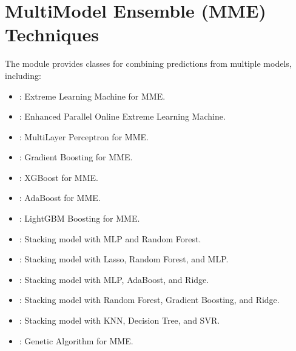 \documentclass[letterpaper,10pt,english]{sphinxmanual}
\begin{document}
\sphinxstepscope


\section{Multi\sphinxhyphen{}Model Ensemble (MME) Techniques}
\label{\detokenize{mme:multi-model-ensemble-mme-techniques}}\label{\detokenize{mme::doc}}
\sphinxAtStartPar
The  module provides classes for combining predictions from multiple models, including:
\begin{itemize}
\item {} 
\sphinxAtStartPar
{}: Extreme Learning Machine for MME.

\item {} 
\sphinxAtStartPar
{}: Enhanced Parallel Online Extreme Learning Machine.

\item {} 
\sphinxAtStartPar
{}: Multi\sphinxhyphen{}Layer Perceptron for MME.

\item {} 
\sphinxAtStartPar
{}: Gradient Boosting for MME.

\item {} 
\sphinxAtStartPar
{}: XGBoost for MME.

\item {} 
\sphinxAtStartPar
{}: AdaBoost for MME.

\item {} 
\sphinxAtStartPar
{}: LightGBM Boosting for MME.

\item {} 
\sphinxAtStartPar
{}: Stacking model with MLP and Random Forest.

\item {} 
\sphinxAtStartPar
{}: Stacking model with Lasso, Random Forest, and MLP.

\item {} 
\sphinxAtStartPar
{}: Stacking model with MLP, AdaBoost, and Ridge.

\item {} 
\sphinxAtStartPar
{}: Stacking model with Random Forest, Gradient Boosting, and Ridge.

\item {} 
\sphinxAtStartPar
{}: Stacking model with KNN, Decision Tree, and SVR.

\item {} 
\sphinxAtStartPar
{}: Genetic Algorithm for MME.

\end{itemize}
\end{document}
